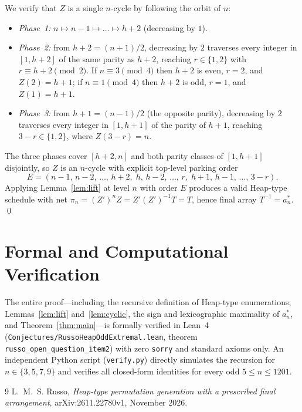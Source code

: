 \documentclass[11pt]{article}
\begin{document}
We verify that $Z$ is a single $n$-cycle by following the orbit of $n$:
\begin{itemize}
\item \emph{Phase~1:} $n \mapsto n - 1 \mapsto \dots \mapsto h + 2$ (decreasing by $1$).
\item \emph{Phase~2:} from $h + 2 = (n + 1)/2$, decreasing by $2$ traverses every
integer in $[1, h + 2]$ of the same parity as $h + 2$, reaching $r \in \{1, 2\}$
with $r \equiv h + 2 \pmod 2$. If $n \equiv 3 \pmod 4$ then $h + 2$ is even,
$r = 2$, and $Z(2) = h + 1$; if $n \equiv 1 \pmod 4$ then $h + 2$ is odd,
$r = 1$, and $Z(1) = h + 1$.
\item \emph{Phase~3:} from $h + 1 = (n - 1)/2$ (the opposite parity), decreasing
by $2$ traverses every integer in $[1, h + 1]$ of the parity of $h + 1$, reaching
$3 - r \in \{1, 2\}$, where $Z(3 - r) = n$.
\end{itemize}
The three phases cover $[h + 2, n]$ and both parity classes of $[1, h + 1]$
disjointly, so $Z$ is an $n$-cycle with explicit top-level parking order
\[
E = (n - 1,\, n - 2,\, \dots,\, h + 2,\; h,\, h - 2,\, \dots,\, r,\; h + 1,\, h - 1,\, \dots,\, 3 - r).
\]
Applying Lemma~\ref{lem:lift} at level $n$ with order $E$ produces a valid
Heap-type schedule with net $\pi_n = (Z')^n Z = Z' (Z')^{-1} T = T$, hence final
array $T^{-1} = a^*_n$. \qed

\section{Formal and Computational Verification}

The entire proof---including the recursive definition of Heap-type enumerations,
Lemmas~\ref{lem:lift} and~\ref{lem:cyclic}, the sign and lexicographic
maximality of $a^*_n$, and Theorem~\ref{thm:main}---is formally verified in
Lean~4 (\texttt{Conjectures/RussoHeapOddExtremal.lean}, theorem
\texttt{russo\_open\_question\_item2}) with zero \texttt{sorry} and standard
axioms only. An independent Python script (\texttt{verify.py}) directly
simulates the recursion for $n \in \{3, 5, 7, 9\}$ and verifies all closed-form
identities for every odd $5 \le n \le 1201$.

\begin{thebibliography}{9}
L.~M.~S. Russo,
\emph{Heap-type permutation generation with a prescribed final arrangement},
arXiv:2611.22780v1, November 2026.
\end{thebibliography}
\end{document}
